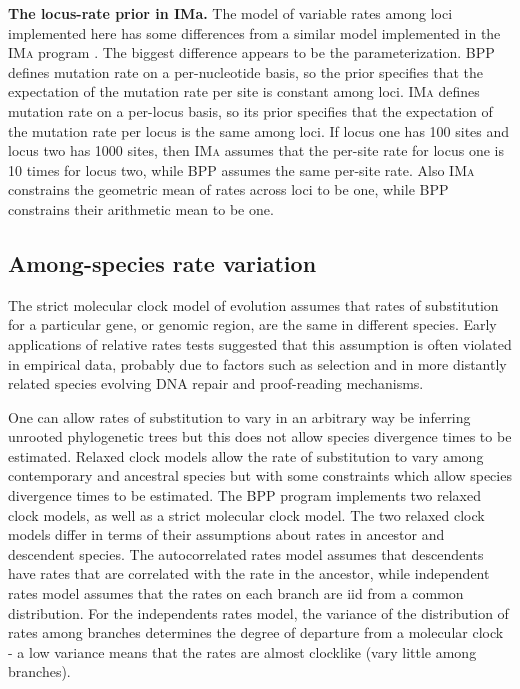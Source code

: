 \documentclass{book}
\numberwithin{equation}{section} \renewcommand{\baselinestretch}{0.55}
\begin{document}
\begin{mdframed}
  \textbf{The locus-rate prior in IMa.}  The model of variable rates
  among loci implemented here has some differences from a similar
  model implemented in the \textsc{IMa} program \citep{Hey2004}.  The
  biggest difference appears to be the parameterization.  \textsc{BPP}
  defines mutation rate on a per-nucleotide basis, so the prior
  specifies that the expectation of the mutation rate per site is
  constant among loci.  \textsc{IMa} defines mutation rate on a
  per-locus basis, so its prior specifies that the expectation of the
  mutation rate per locus is the same among loci.  If locus one has
  100 sites and locus two has 1000 sites, then \textsc{IMa} assumes
  that the per-site rate for locus one is 10 times for locus two,
  while \textsc{BPP} assumes the same per-site rate.  Also
  \textsc{IMa} constrains the geometric mean of rates across loci to
  be one, while \textsc{BPP} constrains their arithmetic mean to be
  one.
\end{mdframed}

\subsection{Among-species rate variation}
The strict molecular clock model of evolution assumes that rates of
substitution for a particular gene, or genomic region, are the same in
different species. Early applications of relative rates tests
suggested that this assumption is often violated in empirical data,
probably due to factors such as selection and in more distantly
related species evolving DNA repair and proof-reading mechanisms.

One can allow rates of substitution to vary in an arbitrary way be
inferring unrooted phylogenetic trees but this does not allow species
divergence times to be estimated. Relaxed clock models allow the rate
of substitution to vary among contemporary and ancestral species but
with some constraints which allow species divergence times to be
estimated. The BPP program implements two relaxed clock models, as
well as a strict molecular clock model. The two relaxed clock models
differ in terms of their assumptions about rates in ancestor and
descendent species. The autocorrelated rates model assumes that
descendents have rates that are correlated with the rate in the
ancestor, while independent rates model assumes that the rates on each
branch are iid from a common distribution.  For the independents rates
model, the variance of the distribution of rates among branches
determines the degree of departure from a molecular clock - a low
variance means that the rates are almost clocklike (vary little among
branches).
\end{document}
